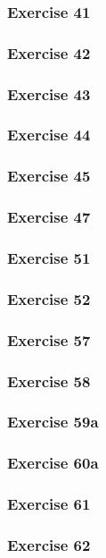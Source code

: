 \documentclass[letterpaper, 12pt]{math}
\begin{document}
\subsubsection*{Exercise 41}
\subsubsection*{Exercise 42}
\subsubsection*{Exercise 43}
\subsubsection*{Exercise 44}
\subsubsection*{Exercise 45}
\subsubsection*{Exercise 47}
\subsubsection*{Exercise 51}
\subsubsection*{Exercise 52}
\subsubsection*{Exercise 57}
\subsubsection*{Exercise 58}
\subsubsection*{Exercise 59a}
\subsubsection*{Exercise 60a}
\subsubsection*{Exercise 61}
\subsubsection*{Exercise 62}
\end{document}
